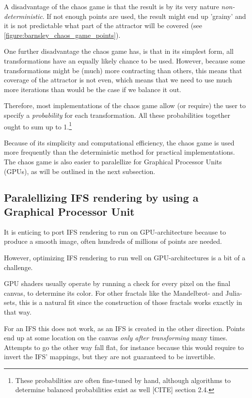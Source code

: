 \documentclass[11pt]{article}
\newcommand*{\altasterism}{\vspace*{1em plus .5em minus .5em}\noindent\hspace*{\fill}\ding{104}\hspace*{\fill}}
\begin{document}
A disadvantage of the chaos game is that the result is by its very nature \emph{non-deterministic}.
If not enough points are used, the result might end up 'grainy' and it is not predictable what part of the attractor will be covered (see \autoref{figure:barnsley_chaos_game_points}).


One further disadvantage the chaos game has, is that in its simplest form, all transformations have an equally likely chance to be used.
However, because some transformations might be (much) more contracting than others, this means that coverage of the attractor is not even,
which means that we need to use much more iterations than would be the case if we balance it out.

Therefore, most implementations of the chaos game allow (or require) the user to specify a \emph{probability} for each transformation.
All these probabilities together ought to sum up to 1.\footnote{These probabilities are often fine-tuned by hand, although algorithms to determine balanced probabilities exist as well [CITE] section 2.4.}

\altasterism

Because of its simplicity and computational efficiency, the chaos game is used more frequently than the deterministic method for practical implementations.
The chaos game is also easier to paralellize for Graphical Processor Units (GPUs), as will be outlined in the next subsection.

\subsection{Paralellizing IFS rendering by using a Graphical Processor Unit}
\label{sec:orge982078}

It is enticing to port IFS rendering to run on GPU-architecture because to produce a smooth image, often hundreds of millions of points are needed.

However, optimizing IFS rendering to run well on GPU-architectures is a bit of a challenge.

GPU shaders usually operate by running a check for every pixel on the final canvas, to determine its color.
For other fractals like the Mandelbrot- and Julia-sets, this is a natural fit since the construction of those fractals works exactly in that way.

For an IFS this does not work, as an IFS is created in the other direction. Points end up at some location on the canvas \emph{only after transforming} many times.
Attempts to go the other way fall flat, for instance because this would require to invert the IFS' mappings, but they are not guaranteed to be invertible.
\end{document}

